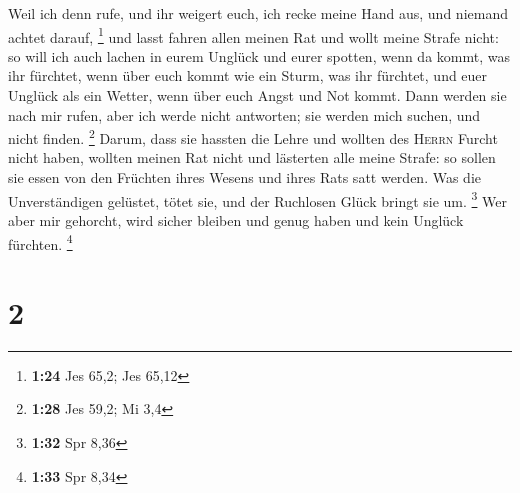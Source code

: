  Weil ich denn rufe, und ihr weigert euch, ich recke
meine Hand aus, und niemand achtet darauf, \footnote{\textbf{1:24} Jes
  65,2; Jes 65,12}  und lasst fahren allen meinen Rat und
wollt meine Strafe nicht:  so will ich auch lachen in
eurem Unglück und eurer spotten, wenn da kommt, was ihr fürchtet,
 wenn über euch kommt wie ein Sturm, was ihr fürchtet,
und euer Unglück als ein Wetter, wenn über euch Angst und Not kommt.
 Dann werden sie nach mir rufen, aber ich werde nicht
antworten; sie werden mich suchen, und nicht finden. \footnote{\textbf{1:28}
  Jes 59,2; Mi 3,4}  Darum, dass sie hassten die Lehre
und wollten des \textsc{Herrn} Furcht nicht haben, 
wollten meinen Rat nicht und lästerten alle meine Strafe:
 so sollen sie essen von den Früchten ihres Wesens und
ihres Rats satt werden.  Was die Unverständigen gelüstet,
tötet sie, und der Ruchlosen Glück bringt sie um. \footnote{\textbf{1:32}
  Spr 8,36}  Wer aber mir gehorcht, wird sicher bleiben
und genug haben und kein Unglück fürchten. \footnote{\textbf{1:33} Spr
  8,34}

\hypertarget{section-1}{%
\section{2}\label{section-1}}

